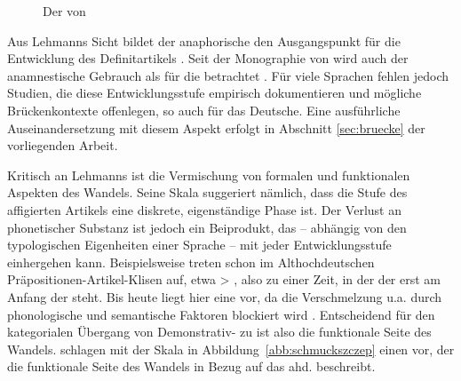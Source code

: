 \begin{figure}
\caption {Der  von \textcite[59]{Lehmann2015}\label{abb:lehmann}}
\end{figure}

Aus Lehmanns Sicht bildet der anaphorische   den Ausgangspunkt für die Entwicklung des Definitartikels \parencite[ebenso:][]{Greenberg1978,Lyons1999}. Seit der Monographie von \textcite{Himmelmann1997} wird auch der anamnestische Gebrauch  als  für die  \parencite[74]{Szczepaniak2011a} betrachtet \parencite[s. hierzu auch den Überblick in][527]{deMulder2011}. Für viele Sprachen fehlen jedoch Studien, die diese Entwicklungsstufe empirisch dokumentieren und mögliche  Brückenkontexte  \parencite[84]{Heine2002a} offenlegen, so auch für das Deutsche. Eine ausführliche  Auseinandersetzung mit diesem Aspekt erfolgt in Abschnitt \ref{sec:bruecke} der vorliegenden Arbeit.

Kritisch an Lehmanns  ist die Vermischung von formalen und funktionalen Aspekten des Wandels. Seine Skala suggeriert nämlich, dass die Stufe des affigierten  Artikels eine diskrete, eigenständige Phase ist. Der Verlust an phonetischer Substanz ist jedoch ein Beiprodukt, das -- abhängig von den typologischen Eigenheiten einer Sprache \parencite[vgl.][33]{Himmelmann2004} -- mit jeder Entwicklungsstufe einhergehen kann. Beispielsweise treten schon im  Althochdeutschen Präpositionen-Artikel-Klisen  auf, etwa  >   \parencite{Schlachter2015}, also zu einer Zeit, in der der  erst am Anfang der  steht. Bis heute liegt hier eine    \parencite{Nubling1992,Nubling2005} vor, da die Verschmelzung u.a. durch phonologische und semantische Faktoren blockiert wird \parencite[s. auch][91]{Szczepaniak2011a}.
Entscheidend für den kategorialen Übergang von Demonstrativ-  zu  ist also die funktionale Seite des Wandels. \textcite{Schmuck2014} schlagen mit der Skala in Abbildung~\ref{abb:schmuckszczep} \parencite[aufbauend auf][]{Lyons1999,Szczepaniak2011a} einen  vor, der die funktionale Seite des Wandels in Bezug auf das ahd.   beschreibt. 

